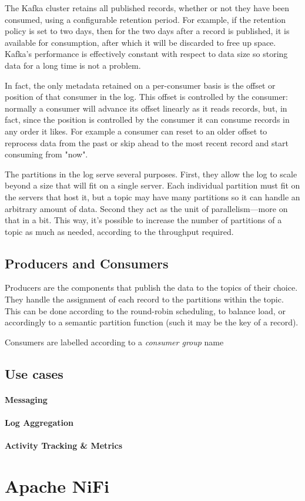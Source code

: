 The Kafka cluster retains all published records, whether or not they have been consumed, using a configurable retention period. For example, if the retention policy is set to two days, then for the two days after a record is published, it is available for consumption, after which it will be discarded to free up space. Kafka's performance is effectively constant with respect to data size so storing data for a long time is not a problem.

In fact, the only metadata retained on a per-consumer basis is the offset or position of that consumer in the log. This offset is controlled by the consumer: normally a consumer will advance its offset linearly as it reads records, but, in fact, since the position is controlled by the consumer it can consume records in any order it likes. For example a consumer can reset to an older offset to reprocess data from the past or skip ahead to the most recent record and start consuming from "now".

The partitions in the log serve several purposes. First, they allow the log to scale beyond a size that will fit on a single server. Each individual partition must fit on the servers that host it, but a topic may have many partitions so it can handle an arbitrary amount of data. Second they act as the unit of parallelism—more on that in a bit. This way, it's possible to increase the number of partitions of a topic as much as needed, according to the throughput required.

\subsection{Producers and Consumers}

Producers are the components that publish the data to the topics of their choice. They handle the assignment of each record to the partitions within the topic. This can be done according to the round-robin scheduling, to balance load, or accordingly to a semantic partition function (such it may be the key of a record).

Consumers are labelled according to a \textit{consumer group} name

\subsection{Use cases}

\paragraph{Messaging}
\paragraph{Log Aggregation}
\paragraph{Activity Tracking \& Metrics}


\section{Apache NiFi}

